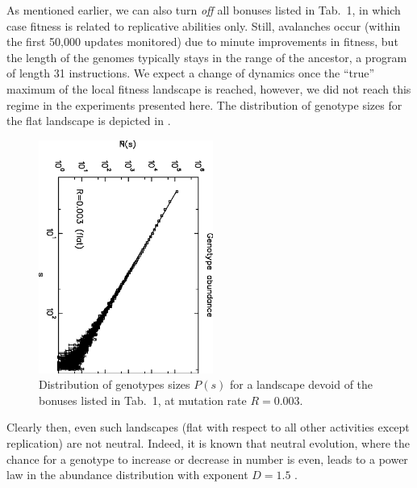 \documentclass[letterpaper]{article}
\begin{document}
As mentioned earlier, we can also turn {\em off} all bonuses listed in
Tab.~1, in which case fitness is related to replicative abilities
only. Still, avalanches occur (within the first 50,000 updates
monitored) due to minute improvements in fitness, but the length of
the genomes typically stays in the range of the ancestor, a program of
length 31 instructions. We expect a change of dynamics once the
``true'' maximum of the local fitness landscape is reached, however,
we did not reach this regime in the experiments presented here. The
distribution of genotype sizes for the flat landscape is depicted in
.

\begin{figure}[ht]
    \centering
    \includegraphics[width=2.25in, angle=90]{fig4.eps}
    \caption{
        Distribution of genotypes sizes $P(s)$ for a landscape devoid
        of the bonuses listed in Tab.~1, at mutation rate $R=0.003$.
    }
    \label{fig4}
\end{figure}

Clearly then, even such landscapes (flat with respect to all other
activities except replication) are not neutral. Indeed, it is known
that neutral evolution, where the chance for a genotype to increase or
decrease in number is even, leads to a power law in the abundance
distribution with exponent $D=1.5$ \citep{ABH}.
\end{document}
